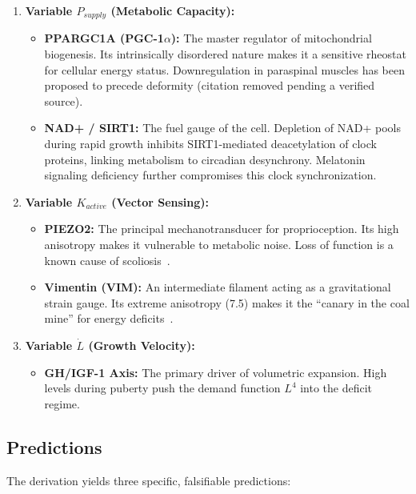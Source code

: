 \begin{enumerate}
    \item \textbf{Variable $P_{supply}$ (Metabolic Capacity):}
    \begin{itemize}
        \item \textbf{PPARGC1A (PGC-1$\alpha$):} The master regulator of mitochondrial biogenesis. Its intrinsically disordered nature makes it a sensitive rheostat for cellular energy status. Downregulation in paraspinal muscles has been proposed to precede deformity (citation removed pending a verified source).
        \item \textbf{NAD+ / SIRT1:} The fuel gauge of the cell. Depletion of NAD+ pools during rapid growth inhibits SIRT1-mediated deacetylation of clock proteins, linking metabolism to circadian desynchrony. Melatonin signaling deficiency further compromises this clock synchronization.
    \end{itemize}

    \item \textbf{Variable $K_{active}$ (Vector Sensing):}
    \begin{itemize}
        \item \textbf{PIEZO2:} The principal mechanotransducer for proprioception. Its high anisotropy makes it vulnerable to metabolic noise. Loss of function is a known cause of scoliosis~\cite{antman2005nonlinear}.
        \item \textbf{Vimentin (VIM):} An intermediate filament acting as a gravitational strain gauge. Its extreme anisotropy (7.5) makes it the ``canary in the coal mine'' for energy deficits~\cite{hu2019vimentin}.
    \end{itemize}

    \item \textbf{Variable $\dot{L}$ (Growth Velocity):}
    \begin{itemize}
        \item \textbf{GH/IGF-1 Axis:} The primary driver of volumetric expansion. High levels during puberty push the demand function $L^4$ into the deficit regime.
    \end{itemize}
\end{enumerate}

\subsection{Predictions}

The derivation yields three specific, falsifiable predictions:

